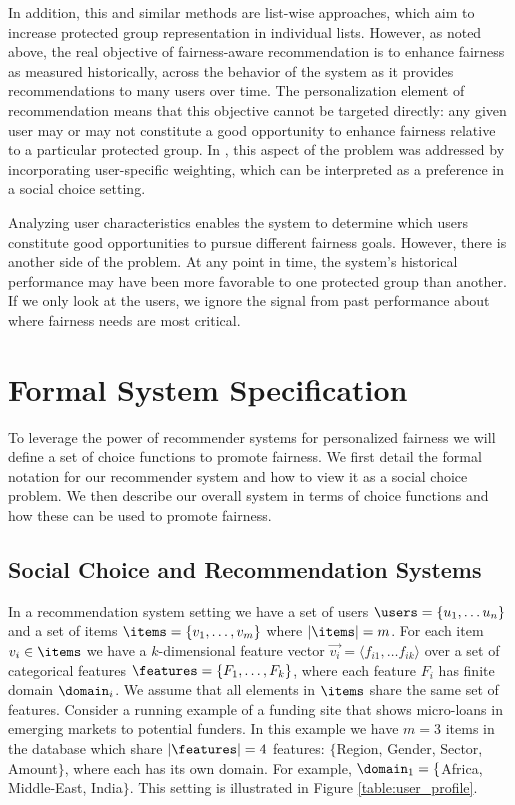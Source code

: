 In addition, this and similar methods are list-wise approaches, which aim to increase protected group representation in individual lists. However, as noted above, the real objective of fairness-aware recommendation is to enhance fairness as measured historically, across the behavior of the system as it provides recommendations to many users over time. The personalization element of recommendation means that this objective cannot be targeted directly: any given user may or may not constitute a good opportunity to enhance fairness relative to a particular protected group. In \cite{sonboli-umap-2020}, this aspect of the problem was addressed by incorporating user-specific weighting, which can be interpreted as a preference in a social choice setting. 

Analyzing user characteristics enables the system to determine which users constitute good opportunities to pursue different fairness goals. However, there is another side of the problem. At any point in time, the system's historical performance may have been more favorable to one protected group than another. If we only look at the users, we ignore the signal from past performance about where fairness needs are most critical.

\section{Formal System Specification}

To leverage the power of recommender systems for personalized fairness we will define a set of choice functions to promote fairness. We first detail the formal notation for our recommender system and how to view it as a social choice problem. We then describe our overall system in terms of choice functions and how these can be used to promote fairness.

\subsection{Social Choice and Recommendation Systems}
In a recommendation system setting we have a set of users $\users = \{u_1, \ldots u_n\}$ and a set of items $\items = \{v_1, \ldots, v_m\}$ where $|\items| = m$. For each item $v_i \in \items$ we have a $k$-dimensional feature vector $\vec{v_i} = \langle f_{i1}, \ldots f_{ik} \rangle$ over a set of categorical features $\features = \{F_1, \ldots, F_k\}$, where each feature $F_i$ has finite domain $\domain_i$. We assume that all elements in $\items$ share the same set of features. 
Consider a running example of a funding site that shows micro-loans in emerging markets to potential funders. In this example we have $m=3$ items in the database which share $|\features|=4$ features: $\{$Region, Gender, Sector, Amount$\}$, where each has its own domain.  For example, $\domain_1 = \{$Africa, Middle-East, India$\}$.  This setting is illustrated in Figure \ref{table:user_profile}.
    
